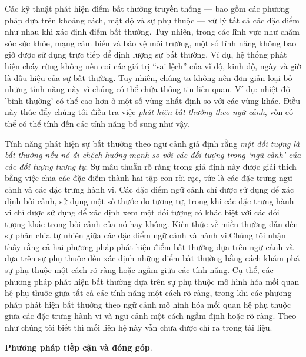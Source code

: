 Các kỹ thuật phát hiện điểm bất thường truyền thống --- bao gồm các phương pháp dựa trên khoảng cách, mật độ và sự phụ thuộc --- xử lý tất cả các đặc điểm như nhau khi xác định điểm bất thường. Tuy nhiên, trong các lĩnh vực như chăm sóc sức khỏe, mạng cảm biến và bảo vệ môi trường, một số tính năng không bao giờ được sử dụng trực tiếp để định lượng sự bất thường. Ví dụ, hệ thống phát hiện cháy rừng không nên coi các giá trị “sai lệch” của vĩ độ, kinh độ, ngày và giờ là dấu hiệu của sự bất thường. Tuy nhiên, chúng ta không nên đơn giản loại bỏ những tính năng này vì chúng có thể chứa thông tin liên quan. Ví dụ: nhiệt độ 'bình thường' có thể cao hơn ở một số vùng nhất định so với các vùng khác. Điều này thúc đẩy chúng tôi điều tra việc \emph{phát hiện bất thường theo ngữ cảnh}, vốn có thể có thể tính đến các tính năng bổ sung như vậy.

Tính năng phát hiện sự bất thường theo ngữ cảnh giả định rằng \textit{một đối tượng là bất thường nếu nó đi chệch hướng mạnh so với các đối tượng trong `ngữ cảnh' của các đối tượng tương tự}. Sự mâu thuẫn rõ ràng trong giả định này được giải thích bằng việc chia các đặc điểm thành hai tập con rời rạc, tức là các đặc trưng ngữ cảnh và các đặc trưng hành vi. Các đặc điểm ngữ cảnh chỉ được sử dụng để xác định bối cảnh, sử dụng một số thước đo tương tự, trong khi các đặc trưng hành vi chỉ được sử dụng để xác định xem một đối tượng có khác biệt với các đối tượng khác trong bối cảnh của nó hay không. Kiến thức về miền thường dẫn đến sự phân chia tự nhiên giữa các đặc điểm ngữ cảnh và hành vi.Chúng tôi nhận thấy rằng cả hai phương pháp phát hiện điểm bất thường dựa trên ngữ cảnh và dựa trên sự phụ thuộc đều xác định những điểm bất thường bằng cách khám phá sự phụ thuộc một cách rõ ràng hoặc ngầm giữa các tính năng. Cụ thể, các phương pháp phát hiện bất thường dựa trên sự phụ thuộc mô hình hóa mối quan hệ phụ thuộc giữa tất cả các tính năng một cách rõ ràng, trong khi các phương pháp phát hiện bất thường theo ngữ cảnh mô hình hóa mối quan hệ phụ thuộc giữa các đặc trưng hành vi và ngữ cảnh một cách ngầm định hoặc rõ ràng. Theo như chúng tôi biết thì mối liên hệ này vẫn chưa được chỉ ra trong tài liệu.

\smallskip \noindent
\textbf{Phương pháp tiếp cận và đóng góp}.

